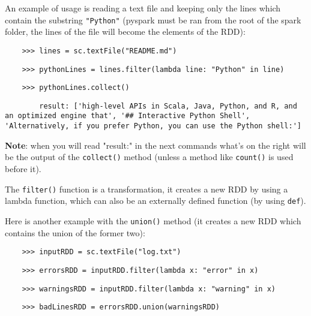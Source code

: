 An example of usage is reading a text file and keeping only the lines which contain the substring \texttt{"Python"} (pyspark must be ran from the root of the spark folder, the lines of the file will become the elements of the RDD):

\begin{lstlisting}
    >>> lines = sc.textFile("README.md")
\end{lstlisting}

\begin{lstlisting}
    >>> pythonLines = lines.filter(lambda line: "Python" in line)
\end{lstlisting}

\begin{lstlisting}
    >>> pythonLines.collect()
\end{lstlisting}

\begin{lstlisting}
        result: ['high-level APIs in Scala, Java, Python, and R, and an optimized engine that', '## Interactive Python Shell', 'Alternatively, if you prefer Python, you can use the Python shell:']
\end{lstlisting}

\textbf{Note}: when you will read "result:" in the next commands what's on the right will be the output of the \texttt{collect()} method (unless a method like \texttt{count()} is used before it).

The \texttt{filter()} function is a transformation, it creates a new RDD by using a lambda function, which can also be an externally defined function (by using \texttt{def}).


Here is another example with the \texttt{union()} method (it creates a new RDD which contains the union of the former two):

\begin{lstlisting}
    >>> inputRDD = sc.textFile("log.txt")
\end{lstlisting}

\begin{lstlisting}
    >>> errorsRDD = inputRDD.filter(lambda x: "error" in x)
\end{lstlisting}

\begin{lstlisting}
    >>> warningsRDD = inputRDD.filter(lambda x: "warning" in x)
\end{lstlisting}

\begin{lstlisting}
    >>> badLinesRDD = errorsRDD.union(warningsRDD)
\end{lstlisting}


